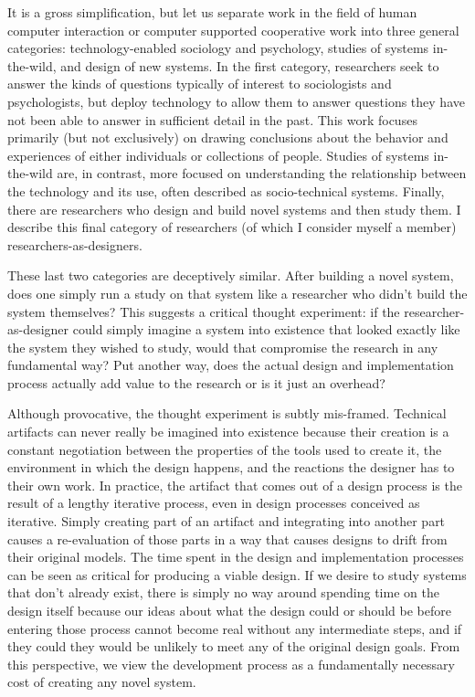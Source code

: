 It is a gross simplification, but let us separate work in the field of human computer interaction or computer supported cooperative work into three general categories: technology-enabled sociology and psychology, studies of systems in-the-wild, and design of new systems. In the first category, researchers seek to answer the kinds of questions typically of interest to sociologists and psychologists, but deploy technology to allow them to answer questions they have not been able to answer in sufficient detail in the past. This work focuses primarily (but not exclusively) on drawing conclusions about the behavior and experiences of either individuals or collections of people. Studies of systems in-the-wild are, in contrast, more focused on understanding the relationship between the technology and its use, often described as socio-technical systems. Finally, there are researchers who design and build novel systems and then study them. I describe this final category of researchers (of which I consider myself a member) researchers-as-designers. 

These last two categories are deceptively similar. After building a novel system, does one simply run a study on that system like a researcher who didn't build the system themselves? This suggests a critical thought experiment: if the researcher-as-designer could simply imagine a system into existence that looked exactly like the system they wished to study, would that compromise the research in any fundamental way? Put another way, does the actual design and implementation process actually add value to the research or is it just an overhead?

Although provocative, the thought experiment is subtly mis-framed. Technical artifacts can never really be imagined into existence because their creation is a constant negotiation between the properties of the tools used to create it, the environment in which the design happens, and the reactions the designer has to their own work. In practice, the artifact that comes out of a design process is the result of a lengthy iterative process, even in design processes conceived as iterative. Simply creating part of an artifact and integrating into another part causes a re-evaluation of those parts in a way that causes designs to drift from their original models. The time spent in the design and implementation processes can be seen as critical for producing a viable design. If we desire to study systems that don't already exist, there is simply no way around spending time on the design itself because our ideas about what the design could or should be before entering those process cannot become real without any intermediate steps, and if they could they would be unlikely to meet any of the original design goals. From this perspective, we view the development process as a fundamentally necessary cost of creating any novel system. 

